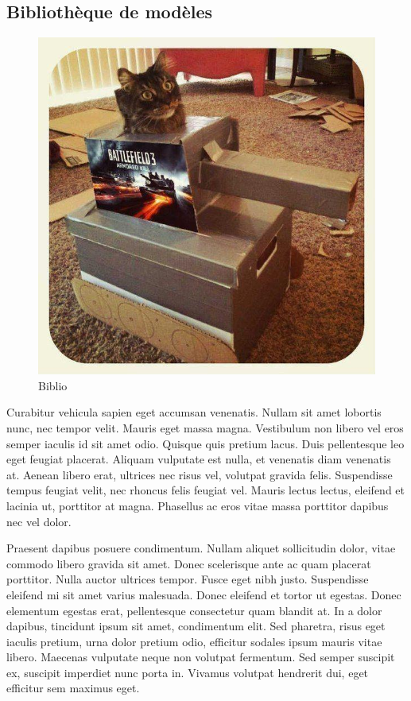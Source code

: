 	\subsection{Bibliothèque de modèles}
		\begin{figure}
			\begin{center}
				\includegraphics[width=1\textwidth]{figure/biblio.jpg}
			\end{center}
			\caption{Biblio}
			\label{fig:biblio}
		\end{figure}

		Curabitur vehicula sapien eget accumsan venenatis. Nullam sit amet lobortis nunc, nec tempor velit. Mauris eget massa magna. Vestibulum non libero vel eros semper iaculis id sit amet odio. Quisque quis pretium lacus. Duis pellentesque leo eget feugiat placerat. Aliquam vulputate est nulla, et venenatis diam venenatis at. Aenean libero erat, ultrices nec risus vel, volutpat gravida felis. Suspendisse tempus feugiat velit, nec rhoncus felis feugiat vel. Mauris lectus lectus, eleifend et lacinia ut, porttitor at magna. Phasellus ac eros vitae massa porttitor dapibus nec vel dolor.

		Praesent dapibus posuere condimentum. Nullam aliquet sollicitudin dolor, vitae commodo libero gravida sit amet. Donec scelerisque ante ac quam placerat porttitor. Nulla auctor ultrices tempor. Fusce eget nibh justo. Suspendisse eleifend mi sit amet varius malesuada. Donec eleifend et tortor ut egestas. Donec elementum egestas erat, pellentesque consectetur quam blandit at. In a dolor dapibus, tincidunt ipsum sit amet, condimentum elit. Sed pharetra, risus eget iaculis pretium, urna dolor pretium odio, efficitur sodales ipsum mauris vitae libero. Maecenas vulputate neque non volutpat fermentum. Sed semper suscipit ex, suscipit imperdiet nunc porta in. Vivamus volutpat hendrerit dui, eget efficitur sem maximus eget.

